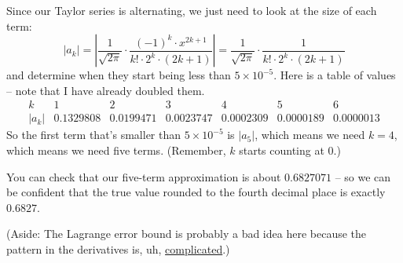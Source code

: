 \documentclass[10pt]{article}
\newenvironment{red}{\color{red}}{\ignorespacesafterend}
\begin{document}
\begin{enumerate}[leftmargin=0pt]
\begin{red}
    Since our Taylor series is alternating, we just need to look at the size of each term:
    \[|a_k| = \left|\frac{1}{\sqrt{2\pi}} \cdot \frac{(-1)^k \cdot x^{2k+1} }{k!\cdot 2^k\cdot(2k+1)} \right| = \frac{1}{\sqrt{2\pi}} \cdot \frac{1}{k!\cdot 2^k\cdot(2k+1)}\] and determine when they start being less than $5\times 10^{-5}$. Here is a table of values -- note that I have already doubled them.
    \[
\begin{array}{c|c|c|c|c|c|c}
k     & 1         & 2         & 3         & 4         & 5         & 6         \\\hline
|a_k| & 0.1329808 & 0.0199471 & 0.0023747 & 0.0002309 & 0.0000189 & 0.0000013
\end{array}
    \]
    So the first term that's smaller than $5\times10^{-5}$ is $|a_5|$, which means we need $k=4$, which means we need five terms. (Remember, $k$ starts counting at 0.)

    You can check that our five-term approximation is about $0.6827071$ -- so we can be confident that the true value rounded to the fourth decimal place is exactly $0.6827$.
    
    (Aside: The Lagrange error bound is probably a bad idea here because the pattern in the derivatives is, uh, \href{https://math.stackexchange.com/questions/1488210/how-to-get-nth-derivative-of-ex2-2}{complicated}.)
    \end{red}
\end{enumerate}
\end{document}
